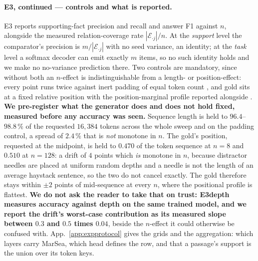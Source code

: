 \documentclass{article}
\begin{document}
\paragraph{E3, continued --- controls and what is reported.} E3 reports supporting-fact
precision and recall and answer F1 against $n$, alongside the measured relation-coverage rate
$|\mathcal{E}_{\cdot j}|/n$. At the \emph{support} level the comparator's precision is
$m/|\mathcal{E}_{\cdot j}|$ with no seed variance, an identity; at the \emph{task} level a
softmax decoder can emit exactly $m$ items, so no such identity holds and we make no
no-variance prediction there. Two controls are mandatory, since without both an $n$-effect is
indistinguishable from a length- or position-effect: every point runs twice against inert padding
of equal token count \citep{du2025context}, and gold sits at a fixed relative position with the
position-marginal profile reported alongside \citep{chowdhury2026birth}. \textbf{We pre-register
what the generator does and does not hold fixed, measured before any accuracy was seen.} Sequence
length is held to $96.4$--$98.8\,\%$ of the requested $16{,}384$ tokens across the whole sweep and
on the padding control, a spread of $2.4\,\%$ that is \emph{not} monotone in $n$. The gold's
position, requested at the midpoint, is held to $0.470$ of the token sequence at $n=8$ and $0.510$
at $n=128$: a drift of $4$ points which \emph{is} monotone in $n$, because distractor needles are
placed at uniform random depths and a needle is not the length of an average haystack sentence, so
the two do not cancel exactly. The gold therefore stays within $\pm2$ points of mid-sequence at
every $n$, where the positional profile is flattest. \textbf{We do not ask the reader to take that
on trust: E3depth measures accuracy against depth on the same trained model, and we report the
drift's worst-case contribution as its measured slope between $0.3$ and $0.5$ times $0.04$},
beside the $n$-effect it could otherwise be confused with. App.~\ref{app:expprotocol}
gives the grids and the aggregation: which layers carry MarSea, which head defines the row, and
that a passage's support is the union over its token keys.
\end{document}

